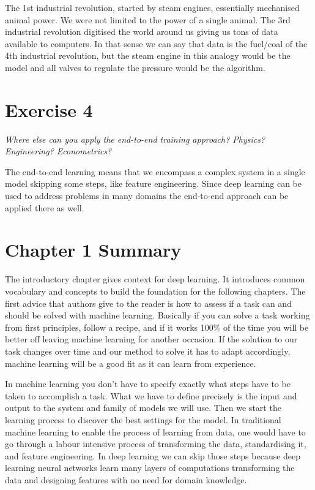 \documentclass[a4paper]{article}
\begin{document}
The 1st industrial revolution, started by steam engines, essentially mechanised animal power. We were not limited to the power of a single animal. The 3rd industrial revolution digitised the world around us giving us tons of data available to computers. In that sense we can say that data is the fuel/coal of the 4th industrial revolution, but the steam engine in this analogy would be the model and all valves to regulate the pressure would be the algorithm. 

\section{Exercise 4}

\emph{Where else can you apply the end-to-end training approach? Physics? Engineering? Econometrics?}

The end-to-end learning means that we encompass a complex system in a single model skipping some steps, like feature engineering. Since deep learning can be used to address problems in many domains the end-to-end approach can be applied there as well.

\section{Chapter 1 Summary}

The introductory chapter gives context for deep learning. It introduces common vocabulary and concepts to build the foundation for the following chapters. The first advice that authors give to the reader is how to assess if a task can and should be solved with machine learning. Basically if you can solve a task working from first principles, follow a recipe, and if it works 100\% of the time you will be better off leaving machine learning for another occasion. If the solution to our task changes over time and our method to solve it has to adapt accordingly, machine learning will be a good fit as it can learn from experience.

In machine learning you don't have to specify exactly what steps have to be taken to accomplish a task. What we have to define precisely is the input and output to the system and family of models we will use. Then we start the learning process to discover the best settings for the model. In traditional machine learning to enable the process of learning from data, one would have to go through a labour intensive process of transforming the data, standardising it, and feature engineering. In deep learning we can skip those steps because deep learning neural networks learn many layers of computations transforming the data and designing features with no need for domain knowledge. 
\end{document}
